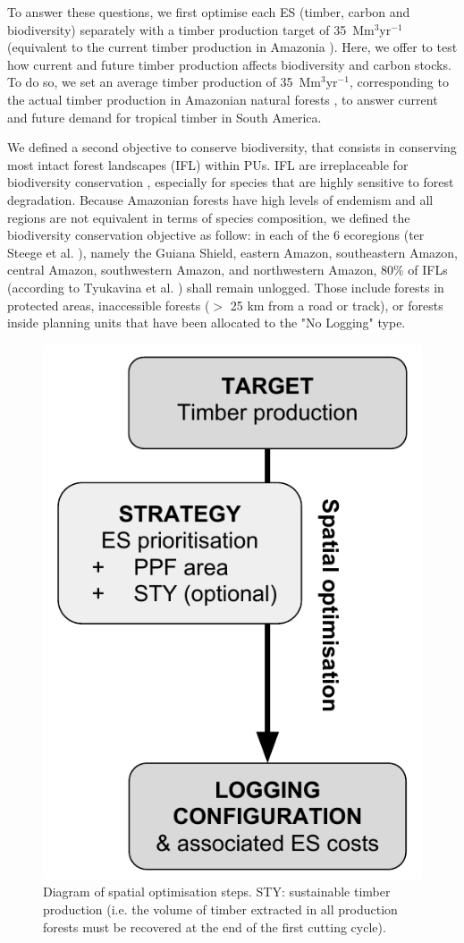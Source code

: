 \documentclass{article}
\begin{document}
To answer these questions, we first optimise each ES (timber, carbon and biodiversity) separately with a timber production target of 35~Mm$^3$yr$^{-1}$ (equivalent to the current timber production in Amazonia \cite{Lentini2005}).
Here, we offer to test how current and future timber production affects biodiversity and carbon stocks.  To do so, we set an average timber production of 35~Mm$^3$yr$^{-1}$, corresponding to the actual timber production in Amazonian natural forests \cite{Lentini2005}, to answer current and future demand for tropical timber in South America. 

We defined a second objective to conserve biodiversity, that consists in conserving most intact forest landscapes (IFL) within PUs. IFL are irreplaceable for biodiversity conservation \cite{Gibson2011}, especially for species that are highly sensitive to forest degradation. Because Amazonian forests have high levels of endemism and all regions are not equivalent in terms of species composition, we defined the biodiversity conservation objective as follow: in each of the 6 ecoregions (ter Steege et al. \cite{TerSteege2013}), namely the Guiana Shield, eastern Amazon, southeastern Amazon, central Amazon, southwestern Amazon, and northwestern Amazon, 80\% of IFLs (according to Tyukavina et al. \cite{Tyukavina2016}) shall remain unlogged. Those include forests in protected areas, inaccessible forests ($>$ 25 km from a road or track), or forests inside planning units that have been allocated to the "No Logging" type. 

\begin{figure}
    \centering
    \includegraphics[width = 0.4\linewidth]{graphs/diagramSpatOptim}
    \caption{Diagram of spatial optimisation steps. STY: sustainable timber production (i.e. the volume of timber extracted in all production forests must be recovered at the end of the first cutting cycle). }
    \label{fig:basicDiagram}
\end{figure}
\end{document}
